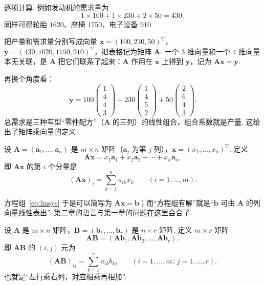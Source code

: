\documentclass[lang=cn,10.5pt,scheme=chinese,toc=twocol,section,chinesefont=nofont,
twoside,citestyle=gb7714-2015,bibstyle=gb7714-2015]{elegantbook}
\DeclareRobustCommand{\textbf}[1]{{\lnsemiboldlatin\lnsemiboldcjk #1}}
\newcommand{\vv}[1]{\boldsymbol{#1}}
\newcommand{\trans}{\mathrm{T}}             %
\numberwithin{equation}{section}   %
\begin{document}
逐项计算. 例如发动机的需求量为
\[1\times100+1\times230+2\times50=430,\]
同样可得轮胎 $1620$、座椅 $1750$、电子设备 $910$.

把产量和需求量分别写成向量 $\vv x=(100,230,50)^\trans$，$\vv y=(430,1620,1750,910)^\trans$，把表格记为矩阵 $\vv A$. 一个 $3$ 维向量和一个 $4$ 维向量本无关联，是 $\vv A$ 把它们联系了起来：$\vv A$ \textbf{作用}在 $\vv x$ 上得到 $\vv y$，记为 $\vv A\vv x=\vv y$.

再换个角度看：
\[
  \vv y=100
  \begin{pmatrix}
    1 \\4\\4\\3
  \end{pmatrix}
  +230
  \begin{pmatrix}
    1 \\4\\5\\2
  \end{pmatrix}
  +50
  \begin{pmatrix}
    2 \\6\\4\\3
  \end{pmatrix}
  .
\]
总需求是三种车型“零件配方”（$\vv A$ 的三列）的线性组合，组合系数就是产量. 这给出了矩阵乘向量的定义.

\begin{definition}
  设 $\vv A=(\vv a_1,\ldots,\vv a_n)$ 是 $m\times n$ 矩阵（$\vv a_j$ 为第 $j$ 列），$\vv x=(x_1,\ldots,x_n)^\trans$. 定义
  \[
    \vv A\vv x=x_1\vv a_1+x_2\vv a_2+\cdots+x_n\vv a_n,
  \]
  即 $\vv A\vv x$ 的第 $i$ 个分量是
  \begin{equation}
    \label{eq:matvec}
    (\vv A\vv x)_i=\sum_{k=1}^n a_{ik}x_k\qquad(i=1,\ldots,m).
  \end{equation}
\end{definition}

方程组~\eqref{eq:linsys} 于是可以简写为 $\vv A\vv x=\vv b$；而“方程组有解”就是“$\vv b$ 可由 $\vv A$ 的列向量线性表出”. 第二章的语言与第一章的问题在这里会合了.

\begin{definition}
  设 $\vv A$ 是 $m\times n$ 矩阵，$\vv B=(\vv b_1,\ldots,\vv b_r)$ 是 $n\times r$ 矩阵. 定义 $m\times r$ 矩阵
  \[
    \vv{AB}=(\vv A\vv b_1,\vv A\vv b_2,\ldots,\vv A\vv b_r),
  \]
  即 $\vv{AB}$ 的 $(i,j)$ 元为
  \begin{equation}
    \label{eq:matmul}
    (\vv{AB})_{ij}=\sum_{k=1}^n a_{ik}b_{kj}\qquad(i=1,\ldots,m;\ j=1,\ldots,r),
  \end{equation}
  也就是“左行乘右列，对应相乘再相加”.
\end{definition}
\end{document}
